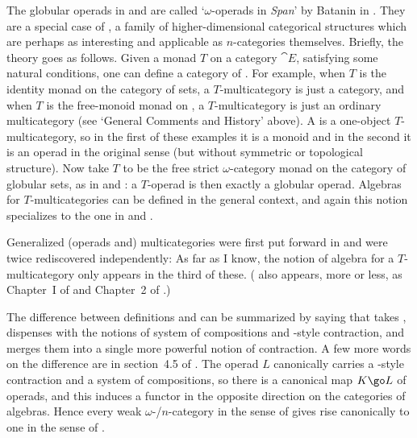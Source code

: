 The globular operads in  and  are called `$\omega$-operads in
\emph{Span}' by Batanin in .  They are a special case of
, a family of higher-dimensional categorical
structures which are perhaps as interesting and applicable as $n$-categories
themselves.  Briefly, the theory goes as follows.  Given a monad $T$ on a
category $\cat{E}$, satisfying some natural conditions, one can define a
category of .  For example, when $T$ is the
identity monad on the category  of sets, a $T$-multicategory is just a
category, and when $T$ is the free-monoid monad on \Set, a $T$-multicategory
is just an ordinary multicategory (see `General Comments and History' above).
A  is a one-object $T$-multicategory, so in the first of
these examples it is a monoid and in the second it is an operad in the
original sense (but without symmetric or topological structure).  Now take
$T$ to be the free strict $\omega$-category monad on the category  of
globular sets, as in  and : a $T$-operad is then exactly a
globular operad.  Algebras for $T$-multicategories can be defined in the
general context, and again this notion specializes to the one in  and
.

Generalized (operads and) multicategories were first put forward in
% 
%
% 
and were twice rediscovered independently:
% 
%
% 
% 
%
% 
As far as I know, the notion of algebra for a $T$-multicategory only appears
in the third of these.  ( also appears, more or less, as Chapter~I
of  and Chapter~2 of .) 

The difference between definitions  and  can be summarized by
saying that  takes , dispenses with the notions of system of
compositions and -style contraction, and merges them into a single more
powerful notion of contraction.  A few more words on the difference are in
section~4.5 of .  The operad $L$ canonically carries a
-style contraction and a system of compositions, so there is a
canonical map $K \go L$ of operads, and this induces a functor in the
opposite direction on the categories of algebras.  Hence every weak
$\omega$-/$n$-category in the sense of  gives rise canonically to one
in the sense of .





